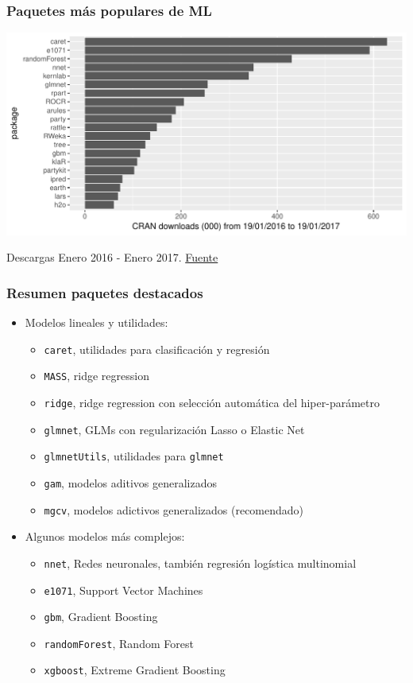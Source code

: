 \documentclass{beamer}
\begin{document}
\begin{frame}
\frametitle{Paquetes más populares de ML}
\centering
\includegraphics[width=\textwidth]{top20.pdf}

{\footnotesize Descargas Enero 2016 - Enero 2017. \href{https://github.com/thedataincubator/data-science-blogs}{Fuente}}
\end{frame}


\begin{frame}
\frametitle{Resumen paquetes destacados}
\begin{itemize}\addtolength{\itemsep}{0.3\baselineskip}
\item Modelos lineales y utilidades:
\begin{itemize}
\item \texttt{caret}, utilidades para clasificación y regresión
\item \texttt{MASS}, ridge regression
\item \texttt{ridge}, ridge regression con selección automática del hiper-parámetro
\item \texttt{glmnet}, GLMs con regularización Lasso o Elastic Net
\item \texttt{glmnetUtils}, utilidades para \texttt{glmnet}
\item \texttt{gam}, modelos aditivos generalizados
\item \texttt{mgcv}, modelos adictivos generalizados (recomendado)
\end{itemize}
\item Algunos modelos más complejos:
\begin{itemize}
\item \texttt{nnet}, Redes neuronales, también regresión logística multinomial
\item \texttt{e1071}, Support Vector Machines
\item \texttt{gbm}, Gradient Boosting
\item \texttt{randomForest}, Random Forest
\item \texttt{xgboost}, Extreme Gradient Boosting
\end{itemize}
\end{itemize}
\end{frame}
\end{document}
